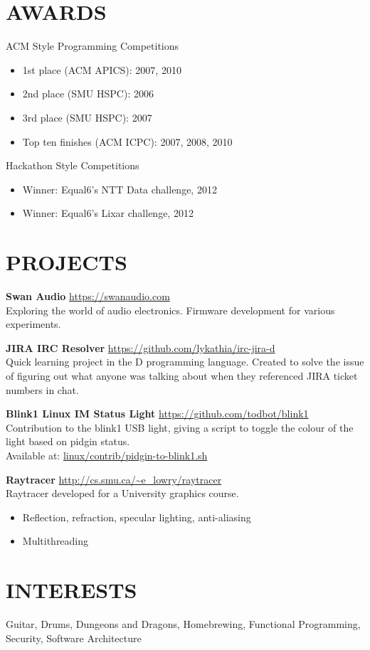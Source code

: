 \documentclass[line,margin]{res}
\begin{document}
\begin{resume}
\section{AWARDS}
ACM Style Programming Competitions
\begin{itemize} \itemsep-2pt
    \item 1st place (ACM APICS): 2007, 2010
    \item 2nd place (SMU HSPC): 2006
    \item 3rd place (SMU HSPC): 2007
    \item Top ten finishes (ACM ICPC): 2007, 2008, 2010
\end{itemize}

Hackathon Style Competitions
\begin{itemize} \itemsep-2pt
    \item Winner: Equal6's NTT Data challenge, 2012
    \item Winner: Equal6's Lixar challenge, 2012
\end{itemize}

\section{PROJECTS}
\textbf{Swan Audio} \hfill \url{https://swanaudio.com} \\
Exploring the world of audio electronics. Firmware development for various experiments. 

\textbf{JIRA IRC Resolver} \hfill \url{https://github.com/lykathia/irc-jira-d} \\
Quick learning project in the D programming language. Created to solve the issue of figuring out what
anyone was talking about when they referenced JIRA ticket numbers in chat.

\textbf{Blink1 Linux IM Status Light} \hfill \url{https://github.com/todbot/blink1} \\
Contribution to the blink1 USB light, giving a script to toggle the colour of the light based on pidgin status. \\
Available at: \href{https://github.com/todbot/blink1/blob/master/linux/contrib/pidgin-to-blink1.sh}{linux/contrib/pidgin-to-blink1.sh}

\textbf{Raytracer} \hfill \url{http://cs.smu.ca/~e_lowry/raytracer} \\
Raytracer developed for a University graphics course.
\begin{itemize} \itemsep-2pt
    \item Reflection, refraction, specular lighting, anti-aliasing
    \item Multithreading
\end{itemize}

\section{INTERESTS}
Guitar, Drums, Dungeons and Dragons, Homebrewing, Functional Programming, Security, Software Architecture

\end{resume}
\end{document}

